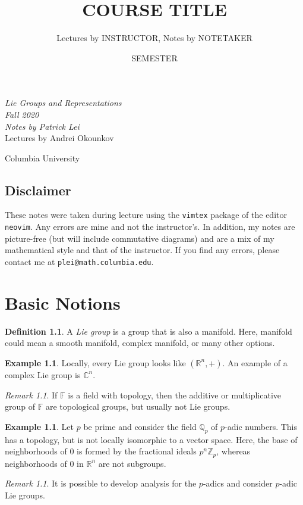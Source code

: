 \documentclass[leqno, openany]{memoir}
\title{COURSE TITLE}
\author{Lectures by INSTRUCTOR, Notes by NOTETAKER}
\date{SEMESTER}
\theoremstyle{definition}
\newtheorem{defn}[thm]{Definition}
\newtheorem{exm}[thm]{Example}
\theoremstyle{remark}
\newtheorem{rmk}[thm]{Remark}
\theoremstyle{plain}
\theoremstyle{definition}
\theoremstyle{remark}
\newcommand{\R}{\mathbb{R}}
\newcommand{\C}{\mathbb{C}}
\newcommand{\Z}{\mathbb{Z}}
\newcommand{\Q}{\mathbb{Q}}
\newcommand*{\titleSW}
    {\begingroup%
    \raggedleft
    \vspace*{\baselineskip}
    {\Huge\itshape Lie Groups and Representations \\ Fall 2020}\\[\baselineskip]
    {\large\itshape Notes by Patrick Lei}\\[0.2\textheight]
    {\Large Lectures by Andrei Okounkov}\par
    \vfill
    {\Large \sffamily Columbia University}
    \vspace*{\baselineskip}
\endgroup}
\begin{document}
    
\begin{titlingpage}
\titleSW
\end{titlingpage}

\thispagestyle{empty}
\section*{Disclaimer}%
\label{sec:disclaimer}

These notes were taken during lecture using the \texttt{vimtex} package of the
editor \texttt{neovim}.  Any errors are mine and not the instructor's.  In
addition, my notes are picture-free (but will include commutative diagrams) and
are a mix of my mathematical style and that of the instructor.  If you find any
errors, please contact me at \texttt{plei@math.columbia.edu}.  \newpage



\tableofcontents

\chapter{Basic Notions}%

\begin{defn} A \textit{Lie group} is a group that is also a manifold. Here,
manifold could mean a smooth manifold, complex manifold, or many other options.
\end{defn}

\begin{exm} Locally, every Lie group looks like $(\R^n, +)$. An example of a
complex Lie group is $\C^n$.  \end{exm}

\begin{rmk} If $\mathbb{F}$ is a field with topology, then the additive or
multiplicative group of $\mathbb{F}$ are topological groups, but usually not
Lie groups.  \end{rmk}

\begin{exm} Let $p$ be prime and consider the field $\Q_p$ of $p$-adic numbers.
    This has a topology, but is not locally isomorphic to a vector space. Here,
    the base of neighborhoods of $0$ is formed by the fractional ideals $p^n
    \Z_p$, whereas neighborhoods of $0$ in $\R^n$ are not subgroups.  \end{exm}

\begin{rmk} It is possible to develop analysis for the $p$-adics and consider
$p$-adic Lie groups.  \end{rmk}
\end{document}
